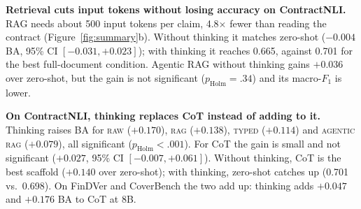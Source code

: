 \documentclass[11pt]{article}
\newcommand{\typed}{\textsc{typed}}
\begin{document}
\noindent \textbf{Retrieval cuts input tokens without losing accuracy on
ContractNLI.} RAG needs about 500 input tokens per claim, 4.8$\times$ fewer
than reading the contract (Figure~\ref{fig:summary}b). Without thinking it
matches zero-shot ($-0.004$ BA, 95\% CI $[-0.031,+0.023]$); with thinking
it reaches 0.665, against 0.701 for the best full-document condition.
Agentic RAG without thinking gains $+0.036$ over zero-shot, but the gain
is not significant ($p_{\mathrm{Holm}}=.34$) and its macro-$F_1$ is lower.

\noindent \textbf{On ContractNLI, thinking replaces CoT instead of adding to
it.} Thinking raises BA for \textsc{raw} ($+0.170$), \textsc{rag}
($+0.138$), \typed{} ($+0.114$) and \textsc{agentic rag} ($+0.079$), all
significant ($p_{\mathrm{Holm}}<.001$). For CoT the gain is small and not
significant ($+0.027$, 95\% CI $[-0.007,+0.061]$). Without thinking, CoT is
the best scaffold ($+0.140$ over zero-shot); with thinking, zero-shot
catches up (0.701 vs.\ 0.698). On FinDVer and CoverBench the two add up:
thinking adds $+0.047$ and $+0.176$ BA to CoT at 8B.
\end{document}
